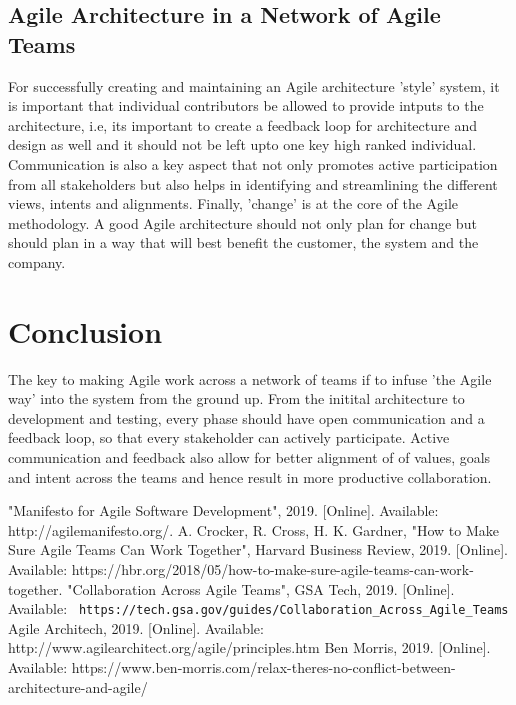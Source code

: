 \documentclass[sigplan,screen]{acmart}
\begin{document}
\subsection{Agile Architecture in a Network of Agile Teams}
For successfully creating and maintaining an Agile architecture 'style' system, it is important that individual contributors be allowed to provide intputs to the architecture, i.e, its important to create a feedback loop for architecture and design as well and it should not be left upto one key high ranked individual.
Communication is also a key aspect that not only promotes active participation from all stakeholders but also helps in identifying and streamlining the different views, intents and alignments.
Finally, 'change' is at the core of the Agile methodology. A good Agile architecture should not only plan for change but should plan in a way that will best benefit the customer, the system and the company.   

\section{Conclusion}
The key to making Agile work across a network of teams if to infuse 'the Agile way' into the system from the ground up.
From the initital architecture to development and testing, every phase should have open communication and a feedback loop, so that every stakeholder can actively participate.
Active communication and feedback also allow for better alignment of of values, goals and intent across the teams and hence result in more productive collaboration.  
 
\begin{thebibliography}{00}
   "Manifesto for Agile Software Development", 2019. [Online]. Available: http://agilemanifesto.org/.
   A. Crocker, R. Cross, H. K. Gardner, "How to Make Sure Agile Teams Can Work Together", Harvard Business Review, 2019. [Online]. Available: https://hbr.org/2018/05/how-to-make-sure-agile-teams-can-work-together.
   "Collaboration Across Agile Teams", GSA Tech, 2019. [Online]. Available: \verb| https://tech.gsa.gov/guides/Collaboration_Across_Agile_Teams|
   Agile Architech, 2019. [Online]. Available: http://www.agilearchitect.org/agile/principles.htm 
   Ben Morris, 2019. [Online]. Available:  https://www.ben-morris.com/relax-theres-no-conflict-between-architecture-and-agile/ 
\end{thebibliography}
\end{document}
